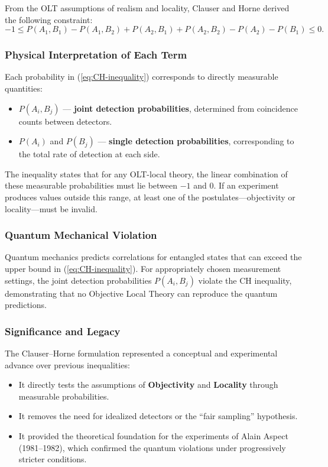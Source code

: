 From the OLT assumptions of realism and locality, Clauser and Horne derived the following constraint:
\begin{equation}
-1 \le P(A_1,B_1) - P(A_1,B_2) + P(A_2,B_1) + P(A_2,B_2) - P(A_2) - P(B_1) \le 0.
\label{eq:CH-inequality}
\end{equation}

\subsubsection{Physical Interpretation of Each Term}

Each probability in (\ref{eq:CH-inequality}) corresponds to directly measurable quantities:
\begin{itemize}
    \item $P(A_i,B_j)$ — \textbf{joint detection probabilities}, determined from coincidence counts between detectors.
    \item $P(A_i)$ and $P(B_j)$ — \textbf{single detection probabilities}, corresponding to the total rate of detection at each side.
\end{itemize}

The inequality states that for any OLT-local theory, the linear combination of these measurable probabilities must lie between $-1$ and $0$.  
If an experiment produces values outside this range, at least one of the postulates—objectivity or locality—must be invalid.

\subsubsection{Quantum Mechanical Violation}

Quantum mechanics predicts correlations for entangled states that can exceed the upper bound in (\ref{eq:CH-inequality}).  
For appropriately chosen measurement settings, the joint detection probabilities $P(A_i,B_j)$ violate the CH inequality, demonstrating that no Objective Local Theory can reproduce the quantum predictions.

\subsubsection{Significance and Legacy}

The Clauser–Horne formulation represented a conceptual and experimental advance over previous inequalities:
\begin{itemize}
    \item It directly tests the assumptions of \textbf{Objectivity} and \textbf{Locality} through measurable probabilities.
    \item It removes the need for idealized detectors or the ``fair sampling'' hypothesis.
    \item It provided the theoretical foundation for the experiments of Alain Aspect (1981–1982), which confirmed the quantum violations under progressively stricter conditions.
\end{itemize}

